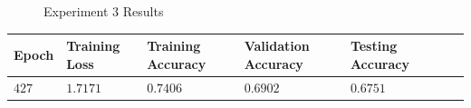 \documentclass[11pt,a4paper]{article}
\begin{document}
\begin{figure}[H]
    \caption{Experiment 3 Results}
\end{figure}
\begin{center}
\hspace*{-0.8cm}
\begin{tabular}{|p{1.2cm}|p{1.8cm}|p{2cm}|p{2cm}|p{2cm}|p{2cm}|p{2cm}|}
\rowcolor{gray!50}
\hline
\textbf{Epoch} & \textbf{Training Loss} & \textbf{Training Accuracy} & \textbf{Validation Accuracy} & \textbf{Testing Accuracy}\\
\hline
$427$ & $1.7171$ & $0.7406$ & $0.6902$ & $0.6751$\\
\hline
\end{tabular}\\
\end{center}
\end{document}
